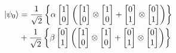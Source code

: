 \begin{equation}\label{eq:prodtenspsi0}
	\begin{split}
\ket{\psi_0} &= \frac{1}{\sqrt{2}}\left\{\alpha \begin{bmatrix}
1 \\
0 
\end{bmatrix} \left( \begin{bmatrix}
1 \\
0 
\end{bmatrix} \otimes \begin{bmatrix}
1 \\
0
\end{bmatrix} + \begin{bmatrix}
0 \\
1
\end{bmatrix} \otimes \begin{bmatrix}
0 \\
1
\end{bmatrix}\right)\right\} \\
&+ \frac{1}{\sqrt{2}}\left\{\beta \begin{bmatrix}
0 \\
1
\end{bmatrix} \left( \begin{bmatrix}
1 \\
0 
\end{bmatrix} \otimes \begin{bmatrix}
1 \\
0
\end{bmatrix} + \begin{bmatrix}
0 \\
1
\end{bmatrix} \otimes \begin{bmatrix}
0 \\
1
\end{bmatrix}\right)\right\}
	\end{split}
\end{equation}

